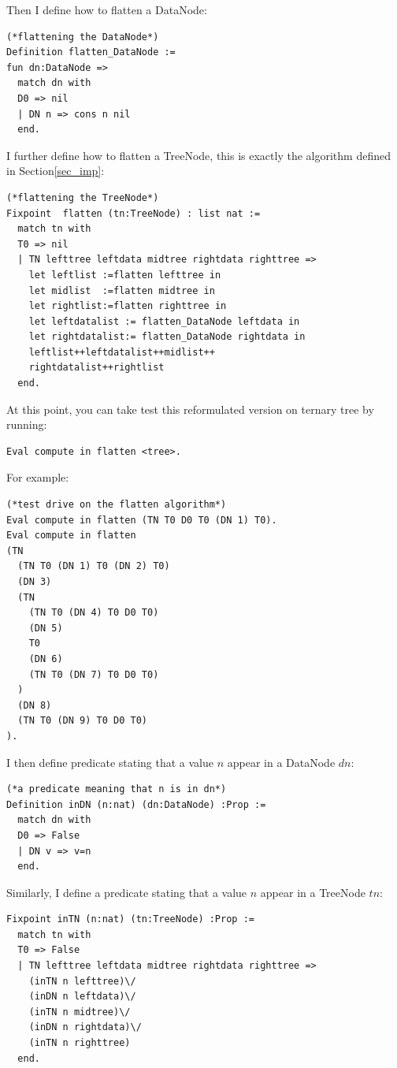 \documentclass[runningheads,a4paper]{llncs}
\begin{document}
Then I define how to flatten a DataNode:

\begin{lstlisting}
(*flattening the DataNode*)
Definition flatten_DataNode :=
fun dn:DataNode =>
  match dn with
  D0 => nil
  | DN n => cons n nil 
  end.
\end{lstlisting}

I further define how to flatten a TreeNode,
this is exactly the algorithm defined in Section\ref{sec_imp}:

\begin{lstlisting}
(*flattening the TreeNode*)
Fixpoint  flatten (tn:TreeNode) : list nat :=
  match tn with
  T0 => nil
  | TN lefttree leftdata midtree rightdata righttree => 
    let leftlist :=flatten lefttree in
    let midlist  :=flatten midtree in
    let rightlist:=flatten righttree in
    let leftdatalist := flatten_DataNode leftdata in
    let rightdatalist:= flatten_DataNode rightdata in
    leftlist++leftdatalist++midlist++
    rightdatalist++rightlist
  end.
\end{lstlisting}

At this point,
you can take test this reformulated version on ternary tree by running:

\begin{lstlisting}
Eval compute in flatten <tree>.
\end{lstlisting}

For example:

\begin{lstlisting}
(*test drive on the flatten algorithm*)
Eval compute in flatten (TN T0 D0 T0 (DN 1) T0).
Eval compute in flatten 
(TN
  (TN T0 (DN 1) T0 (DN 2) T0)
  (DN 3)
  (TN
    (TN T0 (DN 4) T0 D0 T0)
    (DN 5)
    T0
    (DN 6)
    (TN T0 (DN 7) T0 D0 T0)
  )
  (DN 8)
  (TN T0 (DN 9) T0 D0 T0)
).
\end{lstlisting}

I then define predicate stating that a value $n$ appear in a DataNode $dn$:

\begin{lstlisting}
(*a predicate meaning that n is in dn*)
Definition inDN (n:nat) (dn:DataNode) :Prop :=
  match dn with
  D0 => False
  | DN v => v=n
  end.
\end{lstlisting}

Similarly,
I define a predicate stating that a value $n$ appear in a TreeNode $tn$:

\begin{lstlisting}
Fixpoint inTN (n:nat) (tn:TreeNode) :Prop :=
  match tn with
  T0 => False
  | TN lefttree leftdata midtree rightdata righttree =>
    (inTN n lefttree)\/
    (inDN n leftdata)\/
    (inTN n midtree)\/
    (inDN n rightdata)\/
    (inTN n righttree)
  end.
\end{lstlisting}
\end{document}
